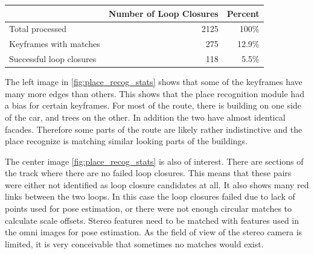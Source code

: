 \begin{table}[h]
  \centering
    \begin{tabular}{ p{5cm} r r} %
    \toprule
    & Number of Loop Closures & Percent \\
    \midrule
    Total processed           & 2125 & 100\% \\
    Keyframes with matches    & 275  & 12.9\% \\
    Successful loop closures  & 118  & 5.5\% \\
    \bottomrule
    \end{tabular}
  \label{tab:place_recog_stats}
\end{table}

The left image in \ref{fig:place_recog_stats} shows that some of the keyframes have many more edges than others.  This shows that the place recognition module had a bias for certain keyframes.  For most of the route, there is building on one side of the car, and trees on the other.  In addition the two have almost identical facades.  Therefore some parts of the route are likely rather indistinctive and the place recognize is matching similar looking parts of the buildings.

The center image \ref{fig:place_recog_stats} is also of interest.  There are sections of the track where there are no failed loop closures.  This means that these pairs were either not identified as loop closure candidates at all.  It also shows many red links between the two loops.  In this case the loop closures failed due to lack of points used for pose estimation, or there were not enough circular matches to calculate scale offsets.  Stereo features need to be matched with features used in the omni images for pose estimation.  As the field of view of the stereo camera is limited, it is very conceivable that sometimes no matches would exist.


